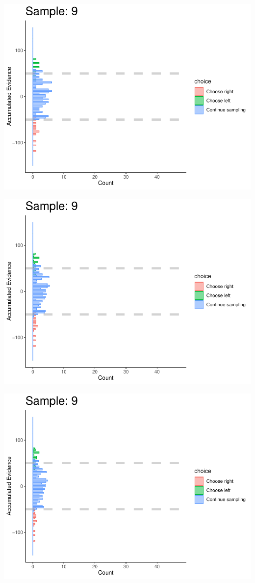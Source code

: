 \documentclass[
]{book}
\begin{document}
\begin{center}\includegraphics[width=0.8\linewidth]{LateNightBayes_files/figure-latex/fixed_check-85} \end{center}

\begin{center}\includegraphics[width=0.8\linewidth]{LateNightBayes_files/figure-latex/fixed_check-86} \end{center}

\begin{center}\includegraphics[width=0.8\linewidth]{LateNightBayes_files/figure-latex/fixed_check-87} \end{center}
\end{document}
